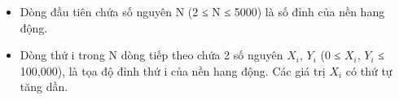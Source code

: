 \begin{itemize}
	\item Dòng đầu tiên chứa số nguyên N (2 ≤ N ≤ 5000) là số đỉnh của nền hang động.
	\item Dòng thứ i trong N dòng tiếp theo chứa 2 số nguyên $X_{i}$, $Y_{i}$ (0 ≤ $X_{i}$, $Y_{i}$ ≤ 100,000), là tọa độ đỉnh thứ i của nền hang động. Các giá trị $X_{i}$ có thứ tự tăng dần.
\end{itemize}